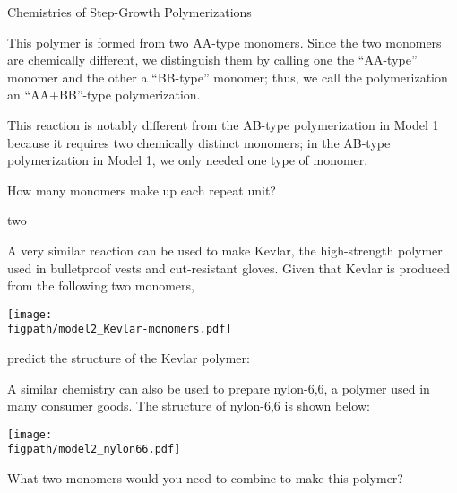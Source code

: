 \begin{activity}{Chemistries of Step-Growth Polymerizations}
\begin{ctqs}
				\begin{solution}[1.75in]
					This polymer is formed from two AA-type monomers.  Since the two monomers are chemically different, we distinguish them by calling one the ``AA-type'' monomer and the other a ``BB-type'' monomer; thus, we call the polymerization an ``AA+BB''-type polymerization.
					
					This reaction is notably different from the AB-type polymerization in Model 1 because it requires two chemically distinct monomers; in the AB-type polymerization in Model 1, we only needed one type of monomer.
				\end{solution}
		
		\question How many monomers make up each repeat unit?
			
				\begin{solution}[1in]
					two
				\end{solution}
		
		\question A very similar reaction can be used to make Kevlar, the high-strength polymer used in bulletproof vests and cut-resistant gloves.  Given that Kevlar is produced from the following two monomers,
		
	
	\centerline{\texttt{[image: \\figpath/model2\_Kevlar-monomers.pdf]}}
		
		predict the structure of the Kevlar polymer:
			
				\begin{solution}[2.5in]
				\end{solution}
		
		\clearpage
		\question A similar chemistry can also be used to prepare nylon-6,6, a polymer used in many consumer goods.
		The structure of nylon-6,6 is shown below:
		
			\centerline{\texttt{[image: \\figpath/model2\_nylon66.pdf]}}
			
		What two monomers would you need to combine to make this polymer?
			
				\begin{solution}[2in]
					\studentdisplay{~}
				\end{solution}
			

\end{ctqs}
\end{activity}
